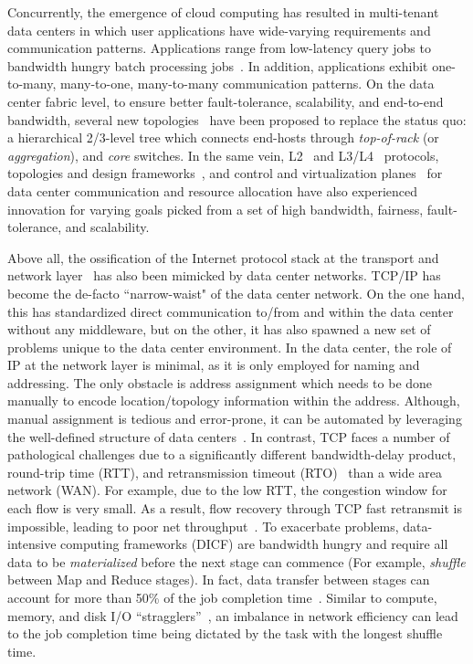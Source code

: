 \documentclass[a4paper,12pt,twoside,openright]{report}
\begin{document}
Concurrently, the emergence of cloud computing has resulted in multi-tenant data
centers in which user applications have wide-varying requirements and
communication patterns. Applications range from low-latency query jobs to
bandwidth hungry batch processing jobs~\cite{Alizadeh:2010:DCT}. In addition,
applications exhibit one-to-many, many-to-one, many-to-many communication
patterns. On the data center fabric level, to ensure better fault-tolerance,
scalability, and end-to-end bandwidth, several new
topologies~\cite{Al-Fares:2008:SCD,Guo:2008:DSF,Guo:2009:BHP,Greenberg:2009:VSF}
have been proposed to replace the status quo: a hierarchical 2/3-level tree
which connects end-hosts through \emph{top-of-rack} (or \emph{aggregation}), and
\emph{core} switches. In the same vein,
L2~\cite{Mudigonda:2010:SCD,Vattikonda:2012:PTD} and
L3/L4~\cite{Alizadeh:2010:DCT,Vasudevan:2009:SEF,Raiciu:2010:DCN,Wilson:2011:BNL,Wu:2010:IIC}
protocols, topologies and design
frameworks~\cite{Singla:2011:JND,Al-Fares:2008:SCD,Guo:2008:DSF,Guo:2009:BHP,Greenberg:2009:VSF,Mudigonda:2011:TFC,Chen:2010:GAA},
and control and virtualization
planes~\cite{NiranjanMysore:2009:PSF,Mudigonda:2011:NSM,Guo:2010:SDC,Ballani:2011:TPD,Shieh:2011:SDC,Rodrigues:2011:GSB,Al-Fares:2010:HDF}
for data center communication and resource allocation have also experienced
innovation for varying goals picked from a set of high bandwidth, fairness,
fault-tolerance, and scalability.

Above all, the ossification of the Internet protocol stack at the transport and
network layer~\cite{Akhshabi:2011:ELP} has also been mimicked by data center
networks. TCP/IP has become the de-facto ``narrow-waist" of the data center
network. On the one hand, this has standardized direct communication to/from and
within the data center without any middleware, but on the other, it has also
spawned a new set of problems unique to the data center environment. In the data
center, the role of IP at the network layer is minimal, as it is only employed
for naming and addressing. The only obstacle is address assignment which needs
to be done manually to encode location/topology information within the address.
Although, manual assignment is tedious and error-prone, it can be automated by
leveraging the well-defined structure of data centers~\cite{Chen:2010:GAA}. In
contrast, TCP faces a number of pathological challenges due to a significantly
different bandwidth-delay product, round-trip time (RTT), and retransmission
timeout (RTO)~\cite{Chen:2009:UTI} than a wide area network (WAN). For example,
due to the low RTT, the congestion window for each flow is very small. As a
result, flow recovery through TCP fast retransmit is impossible, leading to poor
net throughput~\cite{Kandula:2009:NDC}. To exacerbate problems, data-intensive
computing frameworks (DICF) are bandwidth hungry and require all data to be
\emph{materialized} before the next stage can commence (For example,
\emph{shuffle} between Map and Reduce stages). In fact, data transfer between
stages can account for more than 50\% of the job completion
time~\cite{Chowdhury:2011:MDT}. Similar to compute, memory, and disk I/O
``stragglers''~\cite{Zaharia:2008:IMP}, an imbalance in network efficiency can
lead to the job completion time being dictated by the task with the longest
shuffle time.
\end{document}

